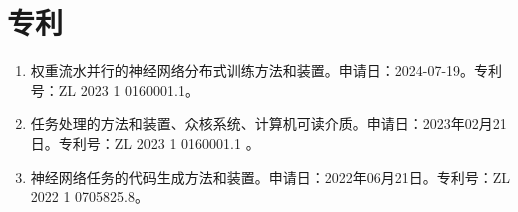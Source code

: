 \documentclass{resume}
\begin{document}


\section{专利}
\begin{enumerate}
        \item 权重流水并行的神经网络分布式训练方法和装置。申请日：2024-07-19。专利号：ZL 2023 1 0160001.1。
    \item 任务处理的方法和装置、众核系统、计算机可读介质。申请日：2023年02月21日。专利号：ZL 2023 1 0160001.1 。
    \item 神经网络任务的代码生成方法和装置。申请日：2022年06月21日。专利号：ZL 2022 1 0705825.8。
\end{enumerate}

\end{document}
